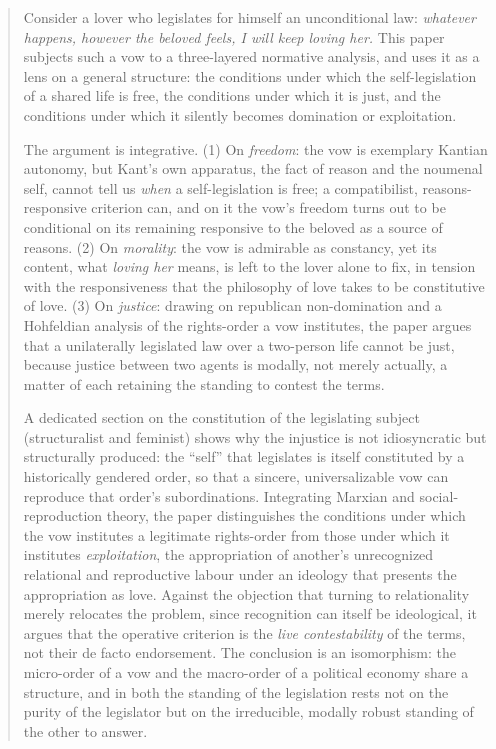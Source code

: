
\begin{abstract}
\noindent
Consider a lover who legislates for himself an unconditional law: \emph{whatever happens, however the beloved feels, I will keep loving her.} This paper subjects such a vow to a three-layered normative analysis, and uses it as a lens on a general structure: the conditions under which the self-legislation of a shared life is free, the conditions under which it is just, and the conditions under which it silently becomes domination or exploitation.

\smallskip
\noindent The argument is integrative. (1) On \emph{freedom}: the vow is exemplary Kantian autonomy, but Kant's own apparatus, the fact of reason and the noumenal self, cannot tell us \emph{when} a self-legislation is free; a compatibilist, reasons-responsive criterion can, and on it the vow's freedom turns out to be conditional on its remaining responsive to the beloved as a source of reasons. (2) On \emph{morality}: the vow is admirable as constancy, yet its content, what \emph{loving her} means, is left to the lover alone to fix, in tension with the responsiveness that the philosophy of love takes to be constitutive of love. (3) On \emph{justice}: drawing on republican non-domination and a Hohfeldian analysis of the rights-order a vow institutes, the paper argues that a unilaterally legislated law over a two-person life cannot be just, because justice between two agents is modally, not merely actually, a matter of each retaining the standing to contest the terms.

\smallskip
\noindent A dedicated section on the constitution of the legislating subject (structuralist and feminist) shows why the injustice is not idiosyncratic but structurally produced: the ``self'' that legislates is itself constituted by a historically gendered order, so that a sincere, universalizable vow can reproduce that order's subordinations. Integrating Marxian and social-reproduction theory, the paper distinguishes the conditions under which the vow institutes a legitimate rights-order from those under which it institutes \emph{exploitation}, the appropriation of another's unrecognized relational and reproductive labour under an ideology that presents the appropriation as love. Against the objection that turning to relationality merely relocates the problem, since recognition can itself be ideological, it argues that the operative criterion is the \emph{live contestability} of the terms, not their de facto endorsement. The conclusion is an isomorphism: the micro-order of a vow and the macro-order of a political economy share a structure, and in both the standing of the legislation rests not on the purity of the legislator but on the irreducible, modally robust standing of the other to answer.


\end{abstract}
